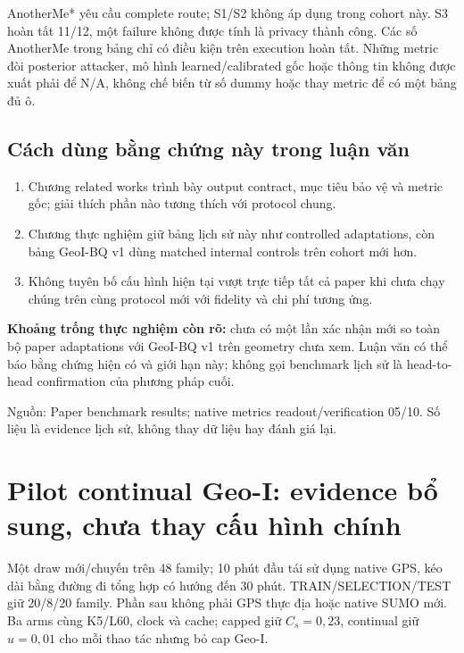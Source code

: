 \documentclass[10pt,a4paper]{article}
\newcommand{\source}[1]{\par{\footnotesize\color{gray}Nguồn: #1}\par}
\begin{document}
AnotherMe* yêu cầu complete route; S1/S2 không áp dụng trong cohort này. S3 hoàn tất 11/12, một failure không
được tính là privacy thành công. Các số AnotherMe trong bảng chỉ có điều kiện trên execution hoàn tất.
Những metric đòi posterior attacker, mô hình learned/calibrated gốc hoặc thông tin không được xuất phải để N/A,
không chế biến từ số dummy hoặc thay metric để có một bảng đủ ô.

\subsection{Cách dùng bằng chứng này trong luận văn}
\begin{enumerate}
\item Chương related works trình bày output contract, mục tiêu bảo vệ và metric gốc; giải thích phần nào tương thích với protocol chung.
\item Chương thực nghiệm giữ bảng lịch sử này như controlled adaptations, còn bảng GeoI-BQ v1 dùng matched internal controls trên cohort mới hơn.
\item Không tuyên bố cấu hình hiện tại vượt trực tiếp tất cả paper khi chưa chạy chúng trên cùng protocol mới với fidelity và chi phí tương ứng.
\end{enumerate}

\textbf{Khoảng trống thực nghiệm còn rõ:} chưa có một lần xác nhận mới so toàn bộ paper adaptations với GeoI-BQ v1
trên geometry chưa xem. Luận văn có thể báo bằng chứng hiện có và giới hạn này; không gọi benchmark lịch sử là
head-to-head confirmation của phương pháp cuối.

\source{Paper benchmark results; native metrics readout/verification 05/10. Số liệu là evidence lịch sử, không thay dữ liệu hay đánh giá lại.}

\clearpage
\section{Pilot continual Geo-I: evidence bổ sung, chưa thay cấu hình chính}
Một draw mới/chuyến trên 48 family; 10 phút đầu tái sử dụng native GPS, kéo dài bằng đường đi tổng hợp có hướng
đến 30 phút. TRAIN/SELECTION/TEST giữ 20/8/20 family. Phần sau không phải GPS thực địa hoặc native SUMO mới.
Ba arms cùng K5/L60, clock và cache; capped giữ $C_s=0{,}23$, continual giữ $u=0{,}01$ cho mỗi thao tác nhưng bỏ cap Geo-I.
\end{document}
